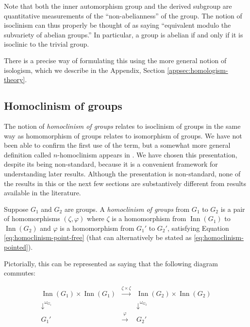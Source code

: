 Note that both the inner automorphism group and the derived subgroup
are quantitative measurements of the ``non-abelianness'' of the
group. The notion of isoclinism can thus properly be thought of as
saying ``equivalent modulo the subvariety of abelian groups.'' In
particular, a group is abelian if and only if it is isoclinic to the
trivial group.

There is a precise way of formulating this using the more general
notion of isologism, which we describe in the Appendix, Section
\ref{appsec:homologism-theory}.

\subsection{Homoclinism of groups}\label{sec:homoclinism-definition}

The notion of {\em homoclinism of groups} relates to isoclinism of
groups in the same way as homomorphism of groups relates to
isomorphism of groups. We have not been able to confirm the first use
of the term, but a somewhat more general definition called
$n$-homoclinism appears in \cite{Hekster}. We have chosen this
presentation, despite its being non-standard, because it is a
convenient framework for understanding later results. Although the
presentation is non-standard, none of the results in this or the next
few sections are substantively different from results available in the
literature.
 
Suppose $G_1$ and $G_2$ are groups. A {\em homoclinism of groups} from
$G_1$ to $G_2$ is a pair of homomorphisms $(\zeta,\varphi)$ where
$\zeta$ is a homomorphism from $\operatorname{Inn}(G_1)$ to
$\operatorname{Inn}(G_2)$ and $\varphi$ is a homomorphism from $G_1'$
to $G_2'$, satisfying Equation \ref{eq:homoclinism-point-free} (that
can alternatively be stated as \ref{eq:homoclinism-pointed}).

Pictorially, this can be represented as saying that the following
diagram commutes:

$$\begin{array}{ccc}
  \operatorname{Inn}(G_1) \times \operatorname{Inn}(G_1) & \stackrel{\zeta \times \zeta}{\to} & \operatorname{Inn}(G_2) \times \operatorname{Inn}(G_2) \\
  \downarrow^{\omega_{G_1}}  & & \downarrow^{\omega_{G_2}}\\
  G_1' & \stackrel{\varphi}{\to} & G_2'\\
\end{array}$$

